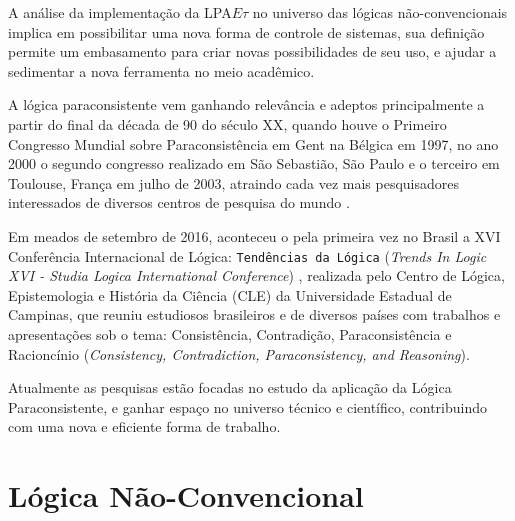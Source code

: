 A análise da implementação da LPA$E\tau$ no universo das lógicas não-convencionais implica em possibilitar uma nova forma de controle de sistemas, sua definição permite um embasamento para criar novas possibilidades de seu uso, e ajudar a sedimentar a nova ferramenta no meio acadêmico. 




A lógica paraconsistente vem ganhando relevância e adeptos 
principalmente a partir do final da década de 90 do século XX, 
quando houve o Primeiro Congresso Mundial sobre 
Paraconsistência em Gent na Bélgica em 1997, 
no ano 2000 o segundo congresso realizado em São Sebastião, São Paulo e o 
terceiro em Toulouse, França em julho de 2003, 
atraindo cada vez mais pesquisadores interessados de 
diversos centros de pesquisa do mundo \cite{DecioKrause}. 

Em meados de setembro de 2016, 
aconteceu o pela primeira vez no Brasil a 
XVI Conferência Internacional de Lógica: 
\texttt{Tendências da Lógica} (\emph{Trends In Logic XVI - 
Studia Logica International Conference}) \cite{trendsinlogic}, 
realizada pelo Centro de Lógica, Epistemologia e História da Ciência (CLE) da 
Universidade Estadual de Campinas, 
que reuniu estudiosos brasileiros e de diversos países com 
trabalhos e apresentações sob o tema: 
Consistência, Contradição, Paraconsistência e Racioncínio 
(\emph{Consistency, Contradiction, Paraconsistency, and Reasoning}).

Atualmente as pesquisas estão focadas no estudo da 
aplicação da Lógica Paraconsistente, 
e ganhar espaço no universo técnico e científico, 
contribuindo com uma nova e eficiente forma de trabalho.










\section{Lógica Não-Convencional}




